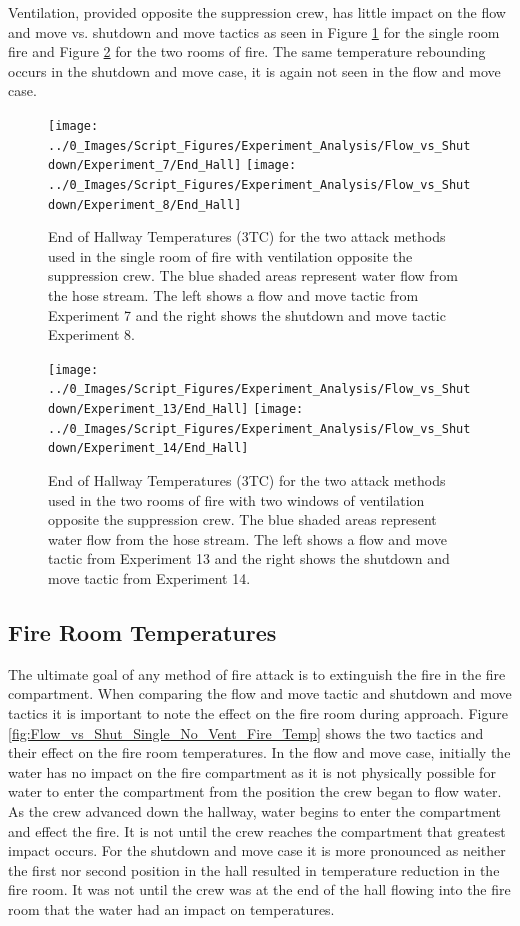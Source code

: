 \documentclass[12pt,oneside]{book}
\begin{document}
Ventilation, provided opposite the suppression crew, has little impact on the flow and move vs. shutdown and move tactics as seen in Figure \ref{fig:Flow_vs_Shut_Single_Vent} for the single room fire and Figure \ref{fig:Flow_vs_Shut_Two_Vent} for the two rooms of fire. The same temperature rebounding occurs in the shutdown and move case, it is again not seen in the flow and move case. 

\begin{figure}[H]
\centering
\texttt{[image: ../0\_Images/Script\_Figures/Experiment\_Analysis/Flow\_vs\_Shutdown/Experiment\_7/End\_Hall]}
\texttt{[image: ../0\_Images/Script\_Figures/Experiment\_Analysis/Flow\_vs\_Shutdown/Experiment\_8/End\_Hall]}
\caption[Hall Temp. - Single Vent - Flow \& Move vs. Shutdown \& Move]{End of Hallway Temperatures (3TC) for the two attack methods used in the single room of fire with ventilation opposite the suppression crew. The blue shaded areas represent water flow from the hose stream. The left shows a flow and move tactic from Experiment 7 and the right shows the shutdown and move tactic Experiment 8.}
\label{fig:Flow_vs_Shut_Single_Vent}
\end{figure} 

\begin{figure}[H]
\centering
\texttt{[image: ../0\_Images/Script\_Figures/Experiment\_Analysis/Flow\_vs\_Shutdown/Experiment\_13/End\_Hall]}
\texttt{[image: ../0\_Images/Script\_Figures/Experiment\_Analysis/Flow\_vs\_Shutdown/Experiment\_14/End\_Hall]}
\caption[Hall Temp. - Two Vents - Flow \& Move vs. Shutdown \& Move]{End of Hallway Temperatures (3TC) for the two attack methods used in the two rooms of fire with two windows of ventilation opposite the suppression crew. The blue shaded areas represent water flow from the hose stream. The left shows a flow and move tactic from Experiment 13 and the right shows the shutdown and move tactic from Experiment 14.}
\label{fig:Flow_vs_Shut_Two_Vent}
\end{figure}

\subsection{Fire Room Temperatures}
The ultimate goal of any method of fire attack is to extinguish the fire in the fire compartment. When comparing the flow and move tactic and shutdown and move tactics it is important to note the effect on the fire room during approach. Figure \ref{fig:Flow_vs_Shut_Single_No_Vent_Fire_Temp} shows the two tactics and their effect on the fire room temperatures. In the flow and move case, initially the water has no impact on the fire compartment as it is not physically possible for water to enter the compartment from the position the crew began to flow water. As the crew advanced down the hallway, water begins to enter the compartment and effect the fire. It is not until the crew reaches the compartment that greatest impact occurs. For the shutdown and move case it is more pronounced as neither the first nor second position in the hall resulted in temperature reduction in the fire room. It was not until the crew was at the end of the hall flowing into the fire room that the water had an impact on temperatures. 
\end{document}
